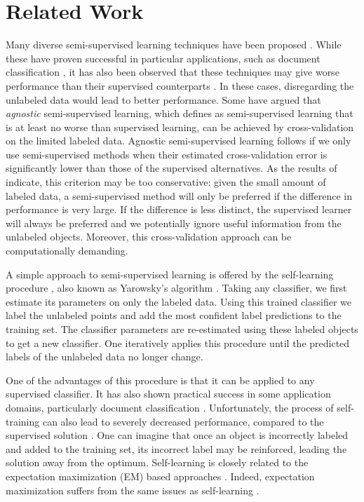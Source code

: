 \documentclass{llncs}
\begin{document}
\section{Related Work} \label{section:relatedwork}
Many diverse semi-supervised learning techniques have been proposed \cite{Chapelle2006,Zhu2009}. While these have proven successful in  particular applications, such as document classification \cite{Nigam2000}, it has also been observed that these techniques may give worse performance than their supervised counterparts \cite{Cozman2003,Cozman2006}. In these cases, disregarding the unlabeled data would lead to better performance. Some \cite{Goldberg2009,Wang2007a} have argued that \emph{agnostic} semi-supervised learning, which \cite{Goldberg2009} defines as semi-supervised learning that is at least no worse than supervised learning, can be achieved by cross-validation on the limited labeled data. Agnostic semi-supervised learning follows if we only use semi-supervised methods when their estimated cross-validation error is significantly lower than those of the supervised alternatives. As the results of  \cite{Goldberg2009} indicate, this criterion may be too conservative: given the small amount of labeled data, a semi-supervised method will only be preferred if the difference in performance is very large. If the difference is less distinct, the supervised learner will always be preferred and we potentially ignore useful information from the unlabeled objects. Moreover, this cross-validation approach can be computationally demanding.

A simple approach to semi-supervised learning is offered by the self-learning procedure \cite{McLachlan1975}, also known as Yarowsky's algorithm \cite{Yarowsky1995,Abney2004}. Taking any classifier, we first estimate its parameters on only  the labeled data. Using this trained classifier we label the unlabeled points and add the most confident label predictions to the training set. The classifier parameters are re-estimated using these labeled objects to get a new classifier. One iteratively applies this procedure until the predicted labels of the unlabeled data no longer change.

One of the advantages of this procedure is that it can be applied to any supervised classifier. It has also shown practical success in some application domains, particularly document classification \cite{Nigam2000,Yarowsky1995}. Unfortunately, the process of self-training can also lead to severely decreased performance, compared to the supervised solution \cite{Cozman2003,Cozman2006}. One can imagine that once an object is incorrectly labeled and added to the training set, its incorrect label may be reinforced, leading the solution away from the optimum. Self-learning is closely related to the expectation maximization (EM) based approaches \cite{Abney2004}. Indeed, expectation maximization suffers from the same issues as self-learning \cite{Zhu2009}.
\end{document}

